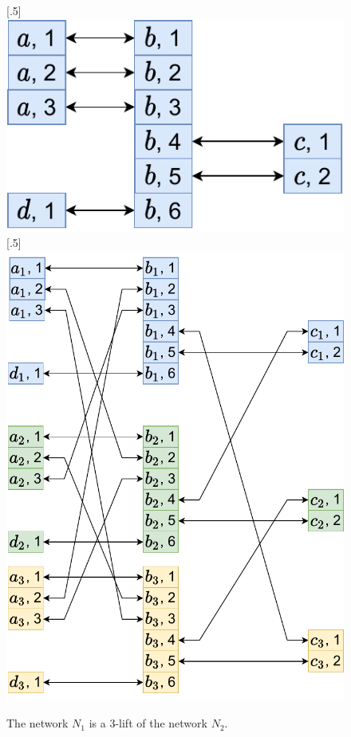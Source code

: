 \begin{figure}[H]
      [.5\linewidth] {
      \centering
      \includegraphics[scale=0.55]{diagrams/algorithm_k-lift_proof_simple_1.pdf}
    }
    \hfill
      [.5\linewidth] {
      \centering
      \includegraphics[scale=0.55]{diagrams/algorithm_k-lift_proof_simple_2.pdf}
    }
    \caption{The network $N_1$ is a 3-lift of the network $N_2$.
    }
    \label{fig:algorithm:k-lift_proof_simple1}
  \end{figure}


